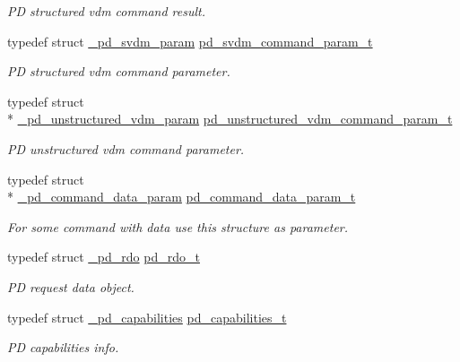 \begin{DoxyCompactItemize}
\begin{DoxyCompactList}\small\item\em P\-D structured vdm command result. \end{DoxyCompactList}\item 
typedef struct \hyperlink{struct__pd__svdm__param}{\-\_\-pd\-\_\-svdm\-\_\-param} \hyperlink{group__usb__pd__stack_gacedc4a601815782eff03211731ea2c7a}{pd\-\_\-svdm\-\_\-command\-\_\-param\-\_\-t}
\begin{DoxyCompactList}\small\item\em P\-D structured vdm command parameter. \end{DoxyCompactList}\item 
typedef struct \\*
\hyperlink{struct__pd__unstructured__vdm__param}{\-\_\-pd\-\_\-unstructured\-\_\-vdm\-\_\-param} \hyperlink{group__usb__pd__stack_ga353c18d85300f7ee60dab2241f2e1310}{pd\-\_\-unstructured\-\_\-vdm\-\_\-command\-\_\-param\-\_\-t}
\begin{DoxyCompactList}\small\item\em P\-D unstructured vdm command parameter. \end{DoxyCompactList}\item 
typedef struct \\*
\hyperlink{struct__pd__command__data__param}{\-\_\-pd\-\_\-command\-\_\-data\-\_\-param} \hyperlink{group__usb__pd__stack_gac903dadc9a1dffbaac4f91f982a038de}{pd\-\_\-command\-\_\-data\-\_\-param\-\_\-t}
\begin{DoxyCompactList}\small\item\em For some command with data use this structure as parameter. \end{DoxyCompactList}\item 
typedef struct \hyperlink{struct__pd__rdo}{\-\_\-pd\-\_\-rdo} \hyperlink{group__usb__pd__stack_ga4dcb1103574222cf94d4b45128f2b884}{pd\-\_\-rdo\-\_\-t}
\begin{DoxyCompactList}\small\item\em P\-D request data object. \end{DoxyCompactList}\item 
typedef struct \hyperlink{struct__pd__capabilities}{\-\_\-pd\-\_\-capabilities} \hyperlink{group__usb__pd__stack_ga1f893b05affdc0ac42173f4dfdfaa258}{pd\-\_\-capabilities\-\_\-t}
\begin{DoxyCompactList}\small\item\em P\-D capabilities info. \end{DoxyCompactList}\item 

\end{DoxyCompactItemize}
